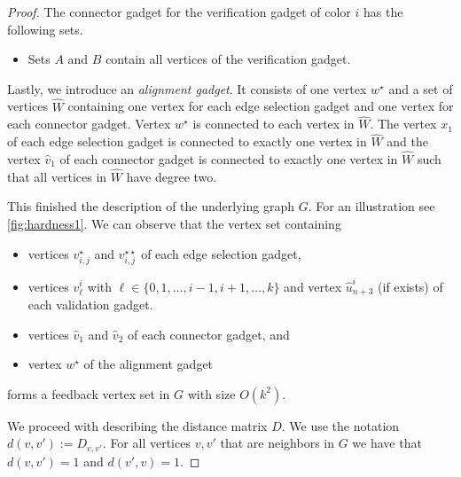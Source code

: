 \documentclass[11pt,a4paper]{article}
\theoremstyle{remark}
\theoremstyle{definition}
\begin{document}
\begin{proof}
    The connector gadget for the verification gadget of color $i$ has the following sets.
    \begin{itemize}
        \item Sets $A$ and $B$ contain all vertices of the verification gadget. %
    \end{itemize}

Lastly, we introduce an \emph{alignment gadget}. It consists of one vertex $w^\star$ and a set of vertices $\hat{W}$ containing one vertex for each edge selection gadget and one vertex for each connector gadget. Vertex $w^\star$ is connected to each vertex in $\hat{W}$.
The vertex $x_1$ of each edge selection gadget is connected to exactly one vertex in $\hat{W}$ and the vertex $\hat{v}_1$ of each connector gadget is connected to exactly one vertex in $\hat{W}$ such that all vertices in $\hat{W}$ have degree two.

This finished the description of the underlying graph $G$. For an illustration see \cref{fig:hardness1}. We can observe that the vertex set containing
\begin{itemize}
    \item vertices $v_{i,j}^\star$ and $v_{i,j}^{\star\star}$ of each edge selection gadget,
    \item vertices $v^i_\ell$ with $\ell\in\{0,1,\ldots,i-1,i+1,\ldots,k\}$ and vertex $\hat{u}^i_{n+3}$ (if exists) of each validation gadget.
    \item vertices $\hat{v}_1$ and $\hat{v}_2$ of each connector gadget, and
    \item vertex $w^\star$ of the alignment gadget
\end{itemize}
forms a feedback vertex set in $G$ with size $O(k^2)$.

We proceed with describing the distance matrix $D$. We use the notation $d(v,v'):= D_{v,v'}$. For all vertices $v,v'$ that are neighbors in $G$ we have that $d(v,v')=1$ and $d(v',v)=1$.


\end{proof}
\end{document}
